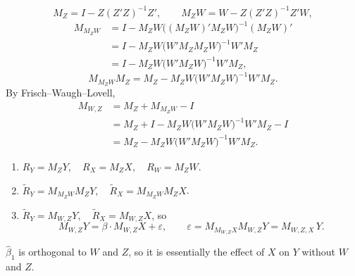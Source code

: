 \documentclass[11pt]{article}
\begin{document}
\[
M_Z=I-Z(Z'Z)^{-1}Z',\qquad M_ZW=W-Z(Z'Z)^{-1}Z'W,
\]
\[
\begin{aligned}
M_{M_ZW}&=I-M_ZW\big((M_ZW)'M_ZW\big)^{-1}(M_ZW)'\\
&=I-M_ZW\big(W'M_Z M_ZW\big)^{-1}W'M_Z\\
&=I-M_ZW\big(W'M_ZW\big)^{-1}W'M_Z,
\end{aligned}
\]
\[
M_{M_ZW}M_Z=M_Z-M_ZW\big(W'M_ZW\big)^{-1}W'M_Z .
\]
By Frisch--Waugh--Lovell,
\[
\begin{aligned}
M_{W,Z}&=M_Z+M_{M_ZW}-I\\
&=M_Z+I-M_ZW\big(W'M_ZW\big)^{-1}W'M_Z-I\\
&=M_Z-M_ZW\big(W'M_ZW\big)^{-1}W'M_Z .
\end{aligned}
\]

\begin{enumerate}[label=\arabic*.]
  \item $R_Y=M_ZY,\quad R_X=M_ZX,\quad R_W=M_ZW$.
  \item $\tilde R_Y=M_{M_ZW}M_ZY,\quad \tilde R_X=M_{M_ZW}M_ZX$.
  \item $\tilde R_Y=M_{W,Z}Y,\quad \tilde R_X=M_{W,Z}X$, so
        \[
        M_{W,Z}Y=\beta\cdot M_{W,Z}X+\varepsilon,\qquad
        \varepsilon=M_{M_{W,Z}X}M_{W,Z}Y=M_{W,Z,X}\,Y .
        \]
\end{enumerate}
$\hat\beta_1$ is orthogonal to $W$ and $Z$, so it is essentially the effect of $X$ on $Y$ without $W$ and $Z$.
\end{document}
